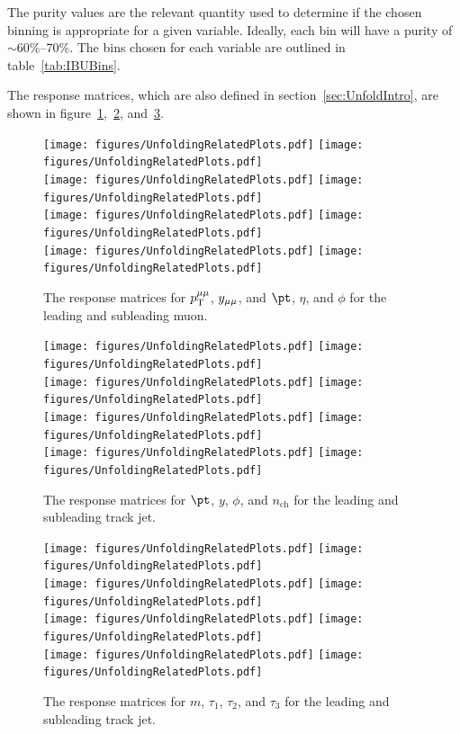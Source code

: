 The purity values are the relevant quantity used to determine if the chosen binning is appropriate for a given variable. Ideally, each bin will have a purity of $\sim$60\%--70\%. The bins chosen for each variable are outlined in table~\ref{tab:IBUBins}.

The response matrices, which are also defined in section~\ref{sec:UnfoldIntro}, are shown in figure~\ref{fig:migMatDilep},~\ref{fig:migMatTJ1}, and~\ref{fig:migMatTJ2}.

\begin{figure}[h!]
  \centering
  \texttt{[image: figures/UnfoldingRelatedPlots.pdf]}
  \texttt{[image: figures/UnfoldingRelatedPlots.pdf]} \\
  \texttt{[image: figures/UnfoldingRelatedPlots.pdf]}
  \texttt{[image: figures/UnfoldingRelatedPlots.pdf]} \\
  \texttt{[image: figures/UnfoldingRelatedPlots.pdf]}
  \texttt{[image: figures/UnfoldingRelatedPlots.pdf]} \\
  \texttt{[image: figures/UnfoldingRelatedPlots.pdf]}
  \texttt{[image: figures/UnfoldingRelatedPlots.pdf]}
  \caption{The response matrices for $p_\mathrm{T}^{\mu\mu}$, $y_{\mu\mu}$, and $\pt$, $\eta$, and $\phi$ for the leading and subleading muon.}
  \label{fig:migMatDilep}
\end{figure}

\begin{figure}[h!]
  \centering
  \texttt{[image: figures/UnfoldingRelatedPlots.pdf]}
  \texttt{[image: figures/UnfoldingRelatedPlots.pdf]} \\
  \texttt{[image: figures/UnfoldingRelatedPlots.pdf]}
  \texttt{[image: figures/UnfoldingRelatedPlots.pdf]} \\
  \texttt{[image: figures/UnfoldingRelatedPlots.pdf]}
  \texttt{[image: figures/UnfoldingRelatedPlots.pdf]} \\
  \texttt{[image: figures/UnfoldingRelatedPlots.pdf]}
  \texttt{[image: figures/UnfoldingRelatedPlots.pdf]}
  \caption{The response matrices for $\pt$, $y$, $\phi$, and $n_{\text{ch}}$ for the leading and subleading track jet.}
  \label{fig:migMatTJ1}
\end{figure}

\begin{figure}[h!]
  \centering
  \texttt{[image: figures/UnfoldingRelatedPlots.pdf]}
  \texttt{[image: figures/UnfoldingRelatedPlots.pdf]} \\
  \texttt{[image: figures/UnfoldingRelatedPlots.pdf]}
  \texttt{[image: figures/UnfoldingRelatedPlots.pdf]} \\
  \texttt{[image: figures/UnfoldingRelatedPlots.pdf]}
  \texttt{[image: figures/UnfoldingRelatedPlots.pdf]} \\
  \texttt{[image: figures/UnfoldingRelatedPlots.pdf]}
  \texttt{[image: figures/UnfoldingRelatedPlots.pdf]}
  \caption{The response matrices for $m$, $\tau_1$, $\tau_2$, and $\tau_3$ for the leading and subleading track jet.}
  \label{fig:migMatTJ2}
\end{figure}

